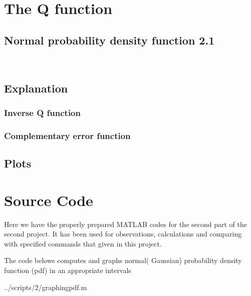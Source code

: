 \section{The Q function}

\subsection{Normal probability density function 2.1}
\



\subsection{Explanation}



\subsubsection{Inverse Q function}



\subsubsection{Complementary error function}



\subsection{Plots}
\section{Source Code}
Here we have the properly prepared MATLAB codes for the second part of the second project. It has been used for observations, calculations and comparing with specified commands that given in this project.

The code belows computes and graphs normal( Gaussian) probability density function (pdf) in an appropriate intervals

\begin{lstinputlisting}[language=Octave]{../scripts/2/graphingpdf.m}
\end{lstinputlisting}
